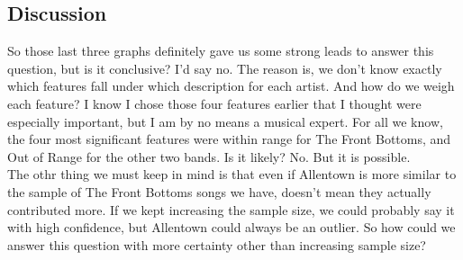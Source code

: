 \documentclass{article}\usepackage[]{graphicx}\usepackage[]{xcolor}
\begin{document}
\begin{multicols}{2}
\section{Discussion}
So those last three graphs definitely gave us some strong leads to answer this question, but is it conclusive? I'd say no. The reason is, we don't know exactly which features fall under which description for each artist. And how do we weigh each feature? I know I chose those four features earlier that I thought were especially important, but I am by no means a musical expert. For all we know, the four most significant features were within range for The Front Bottoms, and Out of Range for the other two bands. Is it likely? No. But it is possible.\\
The othr thing we must keep in mind is that even if Allentown is more similar to the sample of The Front Bottoms songs we have, doesn't mean they actually contributed more. If we kept increasing the sample size, we could probably say it with high confidence, but Allentown could always be an outlier. So how could we answer this question with more certainty other than increasing sample size?
\begin{tiny}

\end{tiny}
\end{multicols}
\end{document}
